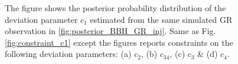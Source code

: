 \documentclass[prd,preprintnumbers,twocolumn,eqsecnum,floatfix,a4paper,nofootinbib,superscriptaddress]{revtex4}
\begin{document}
\begin{figure}[htb]
	\caption{\label{fig:bounds_c2c34c3c4} The figure shows the posterior probability distribution of the deviation parameter $c_1$ estimated from the same simulated GR observation in \ref{fig:posterior_BBH_GR_inj}. Same as Fig. \ref{fig:constraint_c1} except the figures reports constraints on the following deviation parameters:
			 (a) $c_2$, (b) $c_{34}$, (c) $c_3$ \& (d) $c_4$. }
\end{figure}
\end{document}
